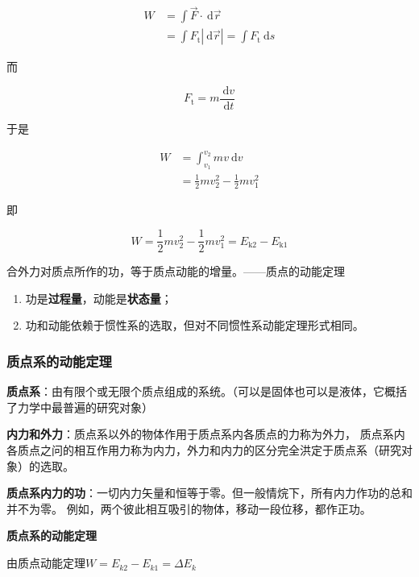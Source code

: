 \documentclass[12pt, a4paper]{article}
\numberwithin{equation}{section}
\begin{document}
    $$
    \begin{aligned}
        W & =\int \overrightarrow{F} \cdot \mathrm{~d} \overrightarrow{r} \\
        & =\int F_{\mathrm{t}}|\mathrm{~d} \overrightarrow{r}|=\int F_{\mathrm{t}} \mathrm{~d} s
    \end{aligned}
    $$

    而

    $$
        F_{\mathrm{t}}=m \frac{\mathrm{~d} v}{\mathrm{~d} t}
    $$

    于是

    $$
        \begin{aligned}
        W & =\int_{v_1}^{v_2} m v \mathrm{~d} v \\
        & =\frac{1}{2} m v_2^2-\frac{1}{2} m v_1^2
        \end{aligned}
    $$

    即

    \begin{equation}
        W=\frac{1}{2} m v_2^2-\frac{1}{2} m v_1^2=E_{\mathrm{k} 2}-E_{\mathrm{k} 1}
    \end{equation}

    合外力对质点所作的功，等于质点动能的增量。——质点的动能定理

    \begin{enumerate}
        \item 功是\textbf{过程量}，动能是\textbf{状态量}；
        \item 功和动能依赖于惯性系的选取，但对不同惯性系动能定理形式相同。
    \end{enumerate}

\subsubsection{质点系的动能定理}

    \textbf{质点系}：由有限个或无限个质点组成的系统。（可以是固体也可以是液体，它概括了力学中最普遍的研究对象）

    \textbf{内力和外力}：质点系以外的物体作用于质点系内各质点的力称为外力，
    质点系内各质点之问的相互作用力称为内力，外力和内力的区分完全洪定于质点系（研究对象）的选取。

    \textbf{质点系内力的功}：一切内力矢量和恒等于零。但一般情烷下，所有内力作功的总和并不为零。
    例如，两个彼此相互吸引的物体，移动一段位移，都作正功。

    \textbf{质点系的动能定理}

    由质点动能定理$W=E_{k 2}-E_{k 1}=\Delta E_k$
\end{document}
